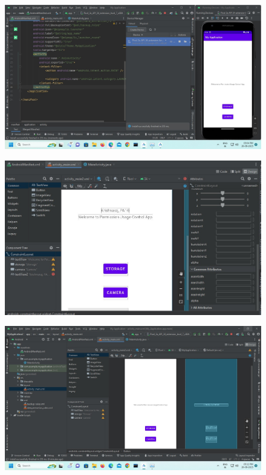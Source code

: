 \documentclass[11pt]{article}
\begin{document}
\begin{figure}[H]
    \centering
    \includegraphics[width=.95\textwidth]{../../Programs/Assignment 4/screenshots/1.jpeg}
    \caption{}
\end{figure}


\begin{figure}[H]
    \centering
    \includegraphics[width=.95\textwidth]{../../Programs/Assignment 4/screenshots/4.jpeg}
    \caption{}
\end{figure}

\begin{figure}[H]
    \centering
    \includegraphics[width=.95\textwidth]{../../Programs/Assignment 4/screenshots/5.jpeg}
    \caption{}
\end{figure}
\end{document}
